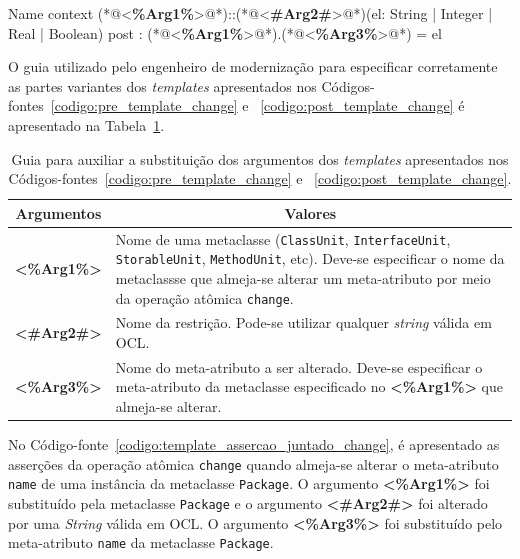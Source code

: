 \begin{codigo}[caption={[\textit{Template} OCL para realizar a pós-condição da operação atômica \texttt{change}.] \textit{Template} OCL para realizar a pré-condição da operação atômica \texttt{change}.},escapeinside={(*@}{@*)}, basicstyle=\footnotesize, label={codigo:post_template_change}, language=OCL]{Name}
context (*@<\textbf{\%Arg1\%}>@*)::(*@<\textbf{\#Arg2\#}>@*)(el: String | Integer | Real | Boolean)
post : (*@<\textbf{\%Arg1\%}>@*).(*@<\textbf{\%Arg3\%}>@*) = el
\end{codigo}

O guia utilizado pelo engenheiro de modernização para especificar corretamente as partes variantes dos \textit{templates} apresentados nos Códigos-fontes~\ref{codigo:pre_template_change} e ~\ref{codigo:post_template_change} é apresentado na Tabela~\ref{tab:guia_template_pre_pos_change}.

\begin{table}[h]
\centering
\caption{Guia para auxiliar a substituição dos argumentos dos \textit{templates} apresentados nos Códigos-fontes~\ref{codigo:pre_template_change} e ~\ref{codigo:post_template_change}.}
\label{tab:guia_template_pre_pos_change}
\begin{tabular}{ | m{1.7cm} | m{12cm}| } 
\hline
\multicolumn{1}{|c|}{Argumentos}                                         & \multicolumn{1}{c|}{Valores} \\ \hline
\multicolumn{1}{|c|}{\textbf{<\%Arg1\%>}} & Nome de uma metaclasse (\texttt{ClassUnit}, \texttt{InterfaceUnit}, \texttt{StorableUnit}, \texttt{MethodUnit}, etc). Deve-se especificar o nome da metaclassse que almeja-se alterar um meta-atributo por meio da operação atômica \texttt{change}. \\ 
\hline
\multicolumn{1}{|c|}{\textbf{<\#Arg2\#>}} & Nome da restrição. Pode-se utilizar qualquer \textit{string} válida em OCL. \\ 
\hline
\multicolumn{1}{|c|}{\textbf{<\%Arg3\%>}} & Nome do meta-atributo a ser alterado. Deve-se especificar o meta-atributo da metaclasse especificado no \textbf{<\%Arg1\%>} que almeja-se alterar. \\ 
\hline
\end{tabular}
\end{table}

No Código-fonte~\ref{codigo:template_assercao_juntado_change}, é apresentado as asserções da operação atômica \texttt{change} quando almeja-se alterar o meta-atributo \texttt{name} de uma instância da metaclasse \texttt{Package}. O argumento \textbf{<\%Arg1\%>} foi substituído pela metaclasse \texttt{Package} e o argumento \textbf{<\#Arg2\#>} foi alterado por uma \textit{String} válida em OCL. O argumento \textbf{<\%Arg3\%>} foi substituído pelo meta-atributo \texttt{name} da metaclasse \texttt{Package}.

